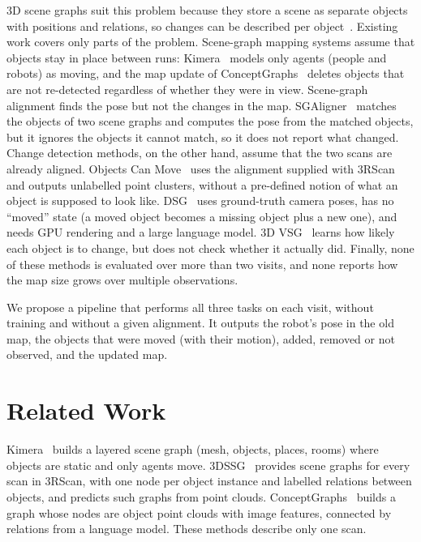 \documentclass[11pt, a4paper]{article}
\begin{document}
3D scene graphs suit this problem because they store a scene as separate objects with positions and relations, so changes can be described per object~\cite{rosinol2021kimera,wald2020learning}. Existing work covers only parts of the problem. Scene-graph mapping systems assume that objects stay in place between runs: Kimera~\cite{rosinol2021kimera} models only agents (people and robots) as moving, and the map update of ConceptGraphs~\cite{gu2024conceptgraphs} deletes objects that are not re-detected regardless of whether they were in view. Scene-graph alignment finds the pose but not the changes in the map. SGAligner~\cite{sarkar2023sgaligner} matches the objects of two scene graphs and computes the pose from the matched objects, but it ignores the objects it cannot match, so it does not report what changed. Change detection methods, on the other hand, assume that the two scans are already aligned. Objects Can Move~\cite{adam2022objects} uses the alignment supplied with 3RScan and outputs unlabelled point clusters, without a pre-defined notion of what an object is supposed to look like. DSG~\cite{dsg2026dynamic} uses ground-truth camera poses, has no ``moved'' state (a moved object becomes a missing object plus a new one), and needs GPU rendering and a large language model. 3D VSG~\cite{looper2023vsg} learns how likely each object is to change, but does not check whether it actually did. Finally, none of these methods is evaluated over more than two visits, and none reports how the map size grows over multiple observations.

We propose a pipeline that performs all three tasks on each visit, without training and without a given alignment. It outputs the robot's pose in the old map, the objects that were moved (with their motion), added, removed or not observed, and the updated map.

\section{Related Work}
Kimera~\cite{rosinol2021kimera} builds a layered scene graph (mesh, objects, places, rooms) where objects are static and only agents move. 3DSSG~\cite{wald2020learning} provides scene graphs for every scan in 3RScan, with one node per object instance and labelled relations between objects, and predicts such graphs from point clouds. ConceptGraphs~\cite{gu2024conceptgraphs} builds a graph whose nodes are object point clouds with image features, connected by relations from a language model. These methods describe only one scan.
\end{document}
